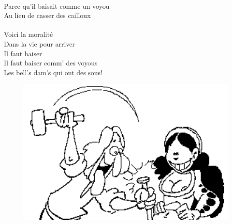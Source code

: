 \\Parce qu'il baisait comme un voyou  
\\Au lieu de casser des cailloux  
\\\\Voici la moralité \bissimple
\\Dans la vie pour arriver \bissimple
\\Il faut baiser \bissimple
\\Il faut baiser comm' des voyous  
\\Les bell's dam's qui ont des sous! \bissimple
\\
\bigskip
\begin{figure}[h!]
\centering
   \includegraphics[width=1\textwidth]{images/cantonnier.png}
 \end{figure}
\breakpage
